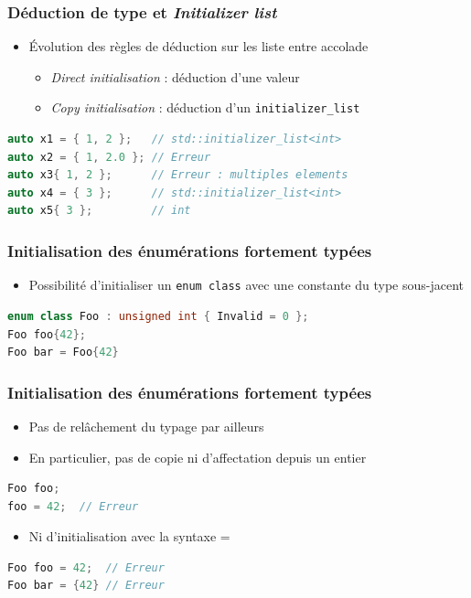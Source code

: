 \documentclass[C++.tex]{subfiles}
\begin{document}
\begin{frame}[fragile]
	\frametitle{Déduction de type et \textit{Initializer list}}
	\begin{itemize}
		\item Évolution des règles de déduction sur les liste entre accolade
		\begin{itemize}
			\item \textit{Direct initialisation} : déduction d'une valeur
			
			
			\item \textit{Copy initialisation} : déduction d'un \lstinline|initializer_list|
			
		\end{itemize}
	\end{itemize}

	\begin{lstlisting}[language=C++]
auto x1 = { 1, 2 };   // std::initializer_list<int>
auto x2 = { 1, 2.0 }; // Erreur
auto x3{ 1, 2 };      // Erreur : multiples elements
auto x4 = { 3 };      // std::initializer_list<int>
auto x5{ 3 };         // int\end{lstlisting}
\end{frame}

\begin{frame}[fragile]
	\frametitle{Initialisation des énumérations fortement typées}
	\begin{itemize}
		\item Possibilité d'initialiser un \lstinline|enum class| avec une constante du type sous-jacent
	\end{itemize}

	\begin{lstlisting}[language=C++]
enum class Foo : unsigned int { Invalid = 0 };
Foo foo{42};
Foo bar = Foo{42}\end{lstlisting}
\end{frame}

\begin{frame}[fragile]
	\frametitle{Initialisation des énumérations fortement typées}
	\begin{itemize}
		\item Pas de relâchement du typage par ailleurs
		\item En particulier, pas de copie ni d'affectation depuis un entier
	\end{itemize}

	\begin{lstlisting}[language=C++]
Foo foo;
foo = 42;  // Erreur\end{lstlisting}

	\begin{itemize}
		\item Ni d'initialisation avec la syntaxe =
	\end{itemize}

	\begin{lstlisting}[language=C++]
Foo foo = 42;  // Erreur
Foo bar = {42} // Erreur\end{lstlisting}
\end{frame}
\end{document}
